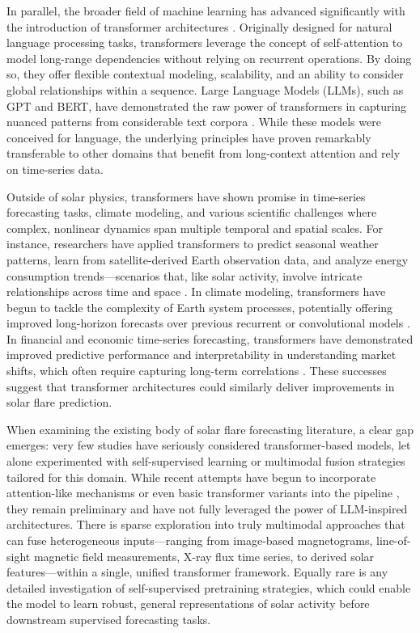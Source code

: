 In parallel, the broader field of machine learning has advanced significantly with the introduction of transformer architectures \citep{RefWorks:RefID:3-vaswani2023provided}. Originally designed for natural language processing tasks, transformers leverage the concept of self-attention to model long-range dependencies without relying on recurrent operations. By doing so, they offer flexible contextual modeling, scalability, and an ability to consider global relationships within a sequence. Large Language Models (LLMs), such as GPT and BERT, have demonstrated the raw power of transformers in capturing nuanced patterns from considerable text corpora \citep{RefWorks:RefID:17-devlinbert:}. While these models were conceived for language, the underlying principles have proven remarkably transferable to other domains that benefit from long-context attention and rely on time-series data.

Outside of solar physics, transformers have shown promise in time-series forecasting tasks, climate modeling, and various scientific challenges where complex, nonlinear dynamics span multiple temporal and spatial scales. For instance, researchers have applied transformers to predict seasonal weather patterns, learn from satellite-derived Earth observation data, and analyze energy consumption trends—scenarios that, like solar activity, involve intricate relationships across time and space \citep{RefWorks:RefID:1-gettelman1997future, RefWorks:RefID:13-yıldız2023effect}. In climate modeling, transformers have begun to tackle the complexity of Earth system processes, potentially offering improved long-horizon forecasts over previous recurrent or convolutional models \citep{RefWorks:RefID:26-liu2024datasets, RefWorks:RefID:24-blumenfeldnasa}. In financial and economic time-series forecasting, transformers have demonstrated improved predictive performance and interpretability in understanding market shifts, which often require capturing long-term correlations \citep{RefWorks:RefID:30-schmude2024prithvi}. These successes suggest that transformer architectures could similarly deliver improvements in solar flare prediction.

When examining the existing body of solar flare forecasting literature, a clear gap emerges: very few studies have seriously considered transformer-based models, let alone experimented with self-supervised learning or multimodal fusion strategies tailored for this domain. While recent attempts have begun to incorporate attention-like mechanisms or even basic transformer variants into the pipeline \citep{RefWorks:RefID:2-abduallah2023operational}, they remain preliminary and have not fully leveraged the power of LLM-inspired architectures. There is sparse exploration into truly multimodal approaches that can fuse heterogeneous inputs—ranging from image-based magnetograms, line-of-sight magnetic field measurements, X-ray flux time series, to derived solar features—within a single, unified transformer framework. Equally rare is any detailed investigation of self-supervised pretraining strategies, which could enable the model to learn robust, general representations of solar activity before downstream supervised forecasting tasks.

